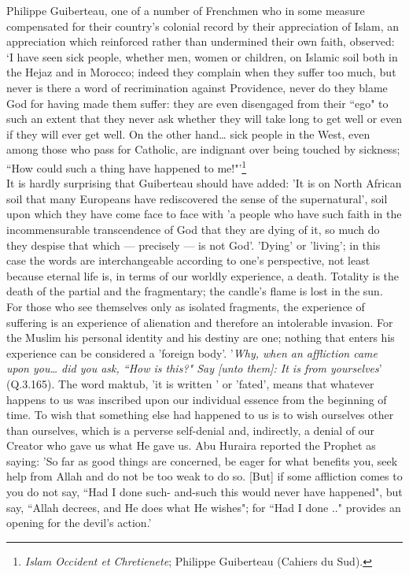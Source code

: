 \documentclass[10pt, twoside,openright]{book}
\begin{document}
Philippe Guiberteau, one of a number of Frenchmen who in some measure compensated for their country's 
colonial record by their appreciation of Islam, an appreciation which reinforced rather than 
undermined their own faith, observed: `I have seen sick people, whether men, women or children, on 
Islamic soil both in the Hejaz and in Morocco; indeed they complain when they suffer too much, but 
never is there a word of recrimination against Providence, never do they blame God for having made 
them suffer: they are even disengaged from their ``ego" to such an extent that they never ask whether 
they will take long to get well or even if they will ever get well. On the other hand\ldots{} sick people 
in the West, even among those who pass for Catholic, are indignant over being touched by sickness; 
``How could such a thing have happened to me!"'\footnote{\emph{Islam Occident et Chretienete}; Philippe Guiberteau (Cahiers du Sud).}\\ 

It is hardly surprising that Guiberteau should have added: 'It is on North African soil that many 
Europeans have rediscovered the sense of the supernatural', soil upon which they have come face to 
face with 'a people who have such faith in the incommensurable transcendence of God that they are 
dying of it, so much do they despise that which --- precisely --- is not God'. 'Dying' or 'living'; in 
this case the words are interchangeable according to one's perspective, not least because eternal 
life is, in terms of our worldly experience, a death. Totality is the death of the partial and the 
fragmentary; the candle's flame is lost in the sun. \\

For those who see themselves only as isolated fragments, the experience of suffering is an experience 
of alienation and therefore an intolerable invasion. For the Muslim his personal identity and his 
destiny are one; nothing that enters his experience can be considered a 'foreign body'. '\emph{Why, when an 
affliction came upon you\ldots{} did you ask, ``How is this?" Say [unto them]: It is from 
yourselves}' (Q.3.165). The word maktub, 'it is written ' or 'fated', means that whatever happens to us 
was inscribed upon our individual essence from the beginning of time. To wish that something else had 
happened to us is to wish ourselves other than ourselves, which is a perverse self\hyp{}denial and, 
indirectly, a denial of our Creator who gave us what He gave us. Abu Huraira reported the Prophet as 
saying: 'So far as good things are concerned, be eager for what benefits you, seek help from Allah 
and do not be too weak to do so. [But] if some affliction comes to you do not say, ``Had I done such\hyp{}
and\hyp{}such this would never have happened", but say, ``Allah decrees, and He does what He wishes"; for 
``Had I done .." provides an opening for the devil's action.' \\
\end{document}
